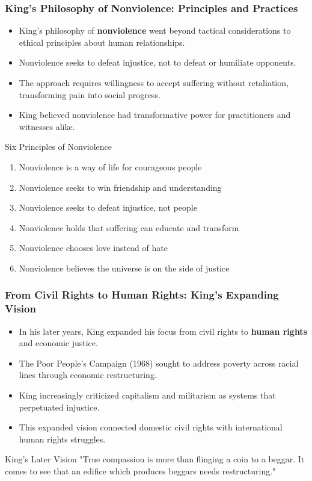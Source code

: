 \documentclass{beamer}
\begin{document}
	\begin{frame}
		\frametitle{King's Philosophy of Nonviolence: Principles and Practices}
		
		\begin{itemize}
			\item King's philosophy of \textbf{nonviolence} went beyond tactical considerations to ethical principles about human relationships.
			\item Nonviolence seeks to defeat injustice, not to defeat or humiliate opponents.
			\item The approach requires willingness to accept suffering without retaliation, transforming pain into social progress.
			\item King believed nonviolence had transformative power for practitioners and witnesses alike.
		\end{itemize}
		
		\begin{block}{Six Principles of Nonviolence}
			\scriptsize
			\begin{enumerate}
				\item Nonviolence is a way of life for courageous people
				\item Nonviolence seeks to win friendship and understanding
				\item Nonviolence seeks to defeat injustice, not people
				\item Nonviolence holds that suffering can educate and transform
				\item Nonviolence chooses love instead of hate
				\item Nonviolence believes the universe is on the side of justice
			\end{enumerate}
		\end{block}
		
	\end{frame}
	
	\begin{frame}
		\frametitle{From Civil Rights to Human Rights: King's Expanding Vision}
		
		\begin{itemize}
			\item In his later years, King expanded his focus from civil rights to \textbf{human rights} and economic justice.
			\item The Poor People's Campaign (1968) sought to address poverty across racial lines through economic restructuring.
			\item King increasingly criticized capitalism and militarism as systems that perpetuated injustice.
			\item This expanded vision connected domestic civil rights with international human rights struggles.
		\end{itemize}
		
		\begin{alertblock}{King's Later Vision}
			"True compassion is more than flinging a coin to a beggar. It comes to see that an edifice which produces beggars needs restructuring."
		\end{alertblock}
		
	\end{frame}
	
\end{document}
